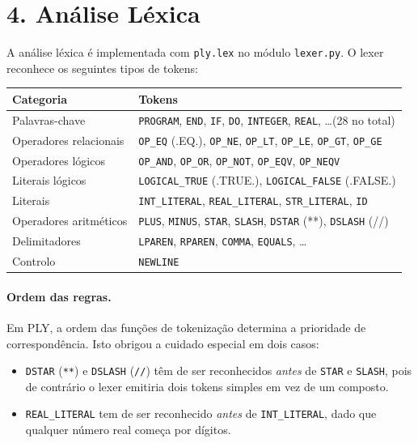 \documentclass[a4paper]{article}
\begin{document}
\section*{4. Análise Léxica}

\noindent A análise léxica é implementada com \texttt{ply.lex} no módulo \texttt{lexer.py}. O lexer reconhece os seguintes tipos de tokens:

\begin{center}
\begin{tabular}{ll}
\toprule
\textbf{Categoria} & \textbf{Tokens} \\
\midrule
Palavras-chave         & \texttt{PROGRAM}, \texttt{END}, \texttt{IF}, \texttt{DO}, \texttt{INTEGER}, \texttt{REAL}, \ldots (28 no total) \\
Operadores relacionais & \texttt{OP\_EQ} (.EQ.), \texttt{OP\_NE}, \texttt{OP\_LT}, \texttt{OP\_LE}, \texttt{OP\_GT}, \texttt{OP\_GE} \\
Operadores lógicos     & \texttt{OP\_AND}, \texttt{OP\_OR}, \texttt{OP\_NOT}, \texttt{OP\_EQV}, \texttt{OP\_NEQV} \\
Literais lógicos       & \texttt{LOGICAL\_TRUE} (.TRUE.), \texttt{LOGICAL\_FALSE} (.FALSE.) \\
Literais               & \texttt{INT\_LITERAL}, \texttt{REAL\_LITERAL}, \texttt{STR\_LITERAL}, \texttt{ID} \\
Operadores aritméticos & \texttt{PLUS}, \texttt{MINUS}, \texttt{STAR}, \texttt{SLASH}, \texttt{DSTAR} (**), \texttt{DSLASH} (//) \\
Delimitadores          & \texttt{LPAREN}, \texttt{RPAREN}, \texttt{COMMA}, \texttt{EQUALS}, \ldots \\
Controlo               & \texttt{NEWLINE} \\
\bottomrule
\end{tabular}
\end{center}

\paragraph{Ordem das regras.} Em PLY, a ordem das funções de tokenização determina a prioridade de correspondência. Isto obrigou a cuidado especial em dois casos:

\begin{itemize}
    \item \texttt{DSTAR} (\texttt{**}) e \texttt{DSLASH} (\texttt{//}) têm de ser reconhecidos \textit{antes} de \texttt{STAR} e \texttt{SLASH}, pois de contrário o lexer emitiria dois tokens simples em vez de um composto.
    \item \texttt{REAL\_LITERAL} tem de ser reconhecido \textit{antes} de \texttt{INT\_LITERAL}, dado que qualquer número real começa por dígitos.
\end{itemize}
\end{document}
